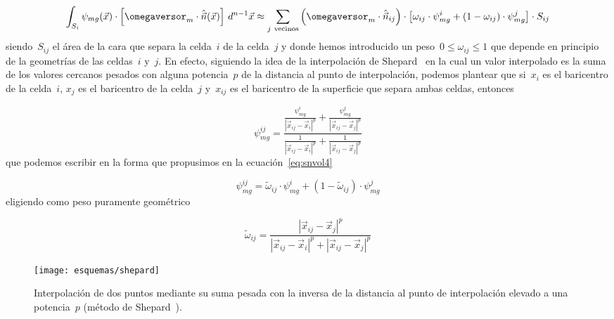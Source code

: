 \begin{equation}\label{eq:snvol4}
 \int_{S_i} \psi_{mg}(\vec{x}) \cdot \left[ \omegaversor_m \cdot \hat{\vec{n}}(\vec{x})\right]  \, d^{n-1}\vec{x}
\approx \sum_{j~\text{vecinos}} \left( \omegaversor_m \cdot \hat{\vec{n}}_{ij}\right) \cdot  \left[ \omega_{ij} \cdot \psi_{mg}^i + (1-\omega_{ij}) \cdot \psi_{mg}^j \right] \cdot S_{ij} 
\end{equation}
%
siendo~$S_{ij}$ el área de la cara que separa la celda~$i$ de la celda~$j$ y donde hemos introducido un peso~$0 \leq \omega_{ij} \leq 1$ que depende en principio de la geometrías de las celdas~$i$ y~$j$. En efecto, siguiendo la idea de la interpolación de Shepard~\cite{shepard} en la cual un valor interpolado es la suma de los valores cercanos pesados con alguna potencia~$p$ de la distancia al punto de interpolación, podemos plantear que si~$x_i$ es el baricentro de la celda~$i$, $x_j$ es el baricentro de la celda~$j$ y~$x_{ij}$ es el baricentro de la superficie que separa ambas celdas, entonces

\begin{equation*}
 \psi_{mg}^{ij} = \frac{\displaystyle \frac{\psi_{mg}^i}{|\vec{x}_{ij} - \vec{x}_i|^p} + \frac{\psi_{mg}^j}{|\vec{x}_{ij} - \vec{x}_j|^p}}
{\displaystyle \frac{1}{|\vec{x}_{ij} - \vec{x}_i|^p} + \frac{1}{|\vec{x}_{ij} - \vec{x}_j|^p}}
\end{equation*}
%
que podemos escribir en la forma que propusimos en la ecuación~\eqref{eq:snvol4}

\begin{equation*}
 \psi_{mg}^{ij} = \tilde{\omega}_{ij} \cdot \psi_{mg}^i + (1-\tilde{\omega}_{ij}) \cdot \psi_{mg}^j 
\end{equation*}
%
eligiendo como peso puramente geométrico

\begin{equation}\label{eq:wij}
 \tilde{\omega}_{ij} = \frac{|\vec{x}_{ij} - \vec{x}_j|^p}{|\vec{x}_{ij} - \vec{x}_i|^p + |\vec{x}_{ij} - \vec{x}_j|^p}
\end{equation}


\begin{figure}
 \begin{center}
  \texttt{[image: esquemas/shepard]}
 \end{center}
\caption{\label{fig:shepard}Interpolación de dos puntos mediante su suma pesada con la inversa de la distancia al punto de interpolación elevado a una potencia~$p$ (método de Shepard~\cite{shepard}).}
\end{figure}

